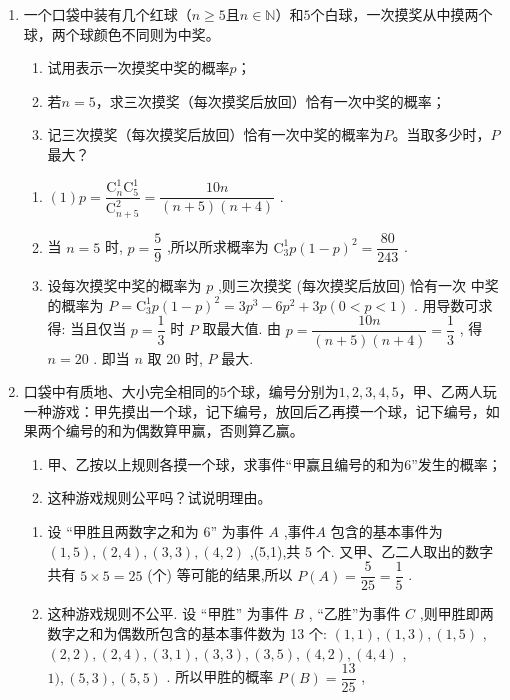 \begin{enumerate}
\item 一个口袋中装有几个红球（$n\ge 5$且$n\in \mathbb{N}$）和$5$个白球，一次摸奖从中摸两个球，两个球颜色不同则为中奖。
\begin{enumerate}
\item 试用表示一次摸奖中奖的概率$p$；
\item 若$n=5$，求三次摸奖（每次摸奖后放回）恰有一次中奖的概率；
\item 记三次摸奖（每次摸奖后放回）恰有一次中奖的概率为$P$。当取多少时，$P$最大？
\end{enumerate}
\begin{jieda}
\begin{enumerate}
    \item $\left( 1\right) p = \dfrac{{\mathrm{C}}_{n}^{1}{\mathrm{C}}_{5}^{1}}{{\mathrm{C}}_{n + 5}^{2}} = \dfrac{10n}{\left( {n + 5}\right) \left( {n + 4}\right) }$ .
    \item 当 $n = 5$ 时, $p = \dfrac{5}{9}$ ,所以所求概率为 ${\mathrm{C}}_{3}^{1}p{\left( 1 - p\right) }^{2} = \dfrac{80}{243}$ .
    \item 设每次摸奖中奖的概率为 $p$ ,则三次摸奖 (每次摸奖后放回) 恰有一次
中奖的概率为 $P = {\mathrm{C}}_{3}^{1}p{\left( 1 - p\right) }^{2} = 3{p}^{3} - 6{p}^{2} + {3p}\left( {0 < p < 1}\right)$ .
用导数可求得: 当且仅当 $p = \dfrac{1}{3}$ 时 $P$ 取最大值. 由 $p = \dfrac{10n}{\left( {n + 5}\right) \left( {n + 4}\right) } = \dfrac{1}{3}$ ,
得 $n = {20}$ .
即当 $n$ 取 20 时, $P$ 最大.
\end{enumerate}
\end{jieda}

\item 口袋中有质地、大小完全相同的$5$个球，编号分别为$1,2,3,4,5$，甲、乙两人玩一种游戏：甲先摸出一个球，记下编号，放回后乙再摸一个球，记下编号，如果两个编号的和为偶数算甲赢，否则算乙赢。
\begin{enumerate}
\item 甲、乙按以上规则各摸一个球，求事件“甲赢且编号的和为$6$”发生的概率；
\item 这种游戏规则公平吗？试说明理由。
\end{enumerate}

\begin{jieda}
    \begin{enumerate}
        \item 设 “甲胜且两数字之和为 6” 为事件 $A$ ,事件$A$ 包含的基本事件为 $\left( {1,5}\right) ,\left( {2,4}\right) ,\left( {3,3}\right) ,\left( {4,2}\right)$ ,(5,1),共 5 个. 又甲、乙二人取出的数字共有 $5 \times$$5 = {25}$ (个) 等可能的结果,所以 $P\left( A\right)  = \dfrac{5}{25} = \dfrac{1}{5}$ .
        \item 这种游戏规则不公平. 设 “甲胜” 为事件 $B$ , “乙胜”为事件 $C$ ,则甲胜即两数字之和为偶数所包含的基本事件数为 13 个: $\left( {1,1}\right) ,\left( {1,3}\right) ,\left( {1,5}\right)$ ,$\left( {2,2}\right) ,\left( {2,4}\right) ,\left( {3,1}\right) ,\left( {3,3}\right) ,\left( {3,5}\right) ,\left( {4,2}\right) ,\left( {4,4}\right)$ ,$1),\left( {5,3}\right) ,\left( {5,5}\right)$ . 所以甲胜的概率 $P\left( B\right)  = \dfrac{13}{25}$ ,
    \end{enumerate}
\end{jieda}



\end{enumerate}
